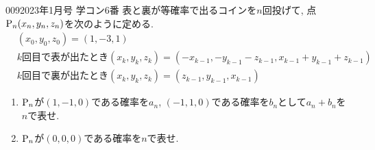 \begin{prob}{009}{}{2023年1月号 学コン6番}
 表と裏が等確率で出るコインを$n$回投げて, 点${\rm P}_n(x_n,y_n,z_n)$を次のように定める.
 \begin{align*}
 &(x_0,y_0,z_0) = (1,-3,1) \\
 &\text{$k$回目で表が出たとき}(x_k,y_k,z_k) = (-x_{k-1}, -y_{k-1} - z_{k-1} , x_{k-1}+y_{k-1} + z_{k-1}) \\
 &\text{$k$回目で裏が出たとき}(x_k,y_k,z_k) = (z_{k-1}, y_{k-1}, x_{k-1})
 \end{align*}
 \begin{enumerate}
  \item ${\rm P}_n$が$(1,-1,0)$である確率を$a_n$, $(-1,1,0)$である確率を$b_n$として$a_n+b_n$を$n$で表せ.
  \item ${\rm P}_n$が$(0,0,0)$である確率を$n$で表せ.
 \end{enumerate}
\end{prob}
